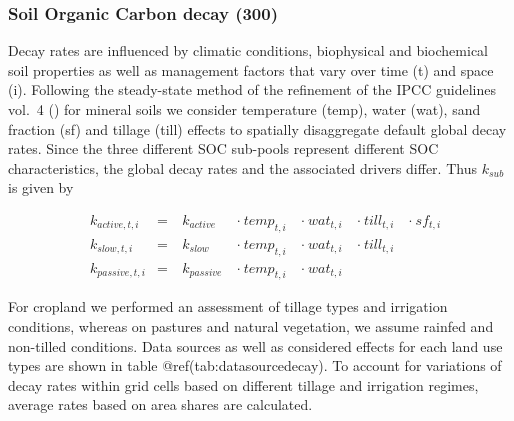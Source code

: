 \documentclass[gc, manuscript]{copernicus}
\begin{document}
\hypertarget{sec:tier2}{%
\subsubsection{Soil Organic Carbon decay (300)}\label{sec:tier2}}

Decay rates are influenced by climatic conditions, biophysical and
biochemical soil properties as well as management factors that vary over
time (t) and space (i). Following the steady-state method of the
refinement of the IPCC guidelines vol.~4 (\citet{ipcc_2019_2019}) for
mineral soils we consider temperature (temp), water (wat), sand fraction
(sf) and tillage (till) effects to spatially disaggregate default global
decay rates. Since the three different SOC sub-pools represent different
SOC characteristics, the global decay rates and the associated drivers
differ. Thus \(k_{sub}\) is given by

\begin{equation}
\begin{aligned}
& k_{active,t,i}  & = &~ k_{active}  ~ &\cdot~ temp_{t,i} ~ &\cdot~ wat_{t,i} ~ &\cdot~ till_{t,i} ~ & \cdot~ sf_{t,i}\\
& k_{slow,t,i}    & = &~ k_{slow}    ~ &\cdot~ temp_{t,i} ~ &\cdot~ wat_{t,i} ~ &\cdot~ till_{t,i} ~ &\\
& k_{passive,t,i} & = &~ k_{passive} ~ &\cdot~ temp_{t,i} ~ &\cdot~ wat_{t,i} ~ & ~ &
\label{eq:decayrates}
\end{aligned}
\end{equation}

For cropland we performed an assessment of tillage types and irrigation
conditions, whereas on pastures and natural vegetation, we assume
rainfed and non-tilled conditions. Data sources as well as considered
effects for each land use types are shown in table
@ref(tab:datasourcedecay). To account for variations of decay rates
within grid cells based on different tillage and irrigation regimes,
average rates based on area shares are calculated.
\end{document}
